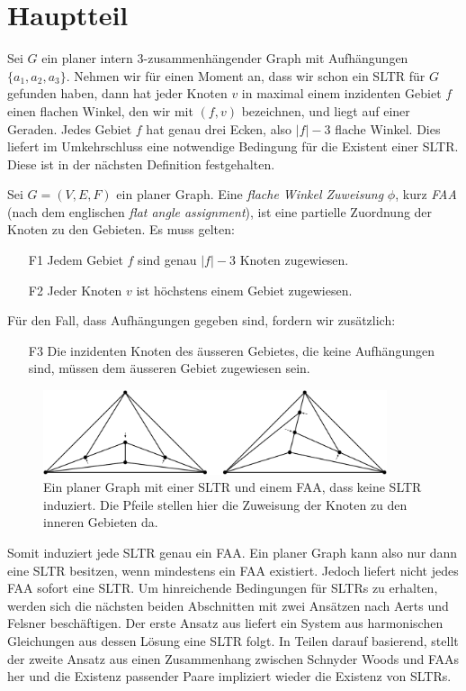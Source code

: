 \chapter{Hauptteil}

Sei $G$ ein planer intern 3-zusammenhängender Graph mit Aufhängungen $\{a_1,a_2,a_3\}$. Nehmen wir für einen Moment an, dass wir schon ein SLTR für $G$ gefunden haben, dann hat jeder Knoten $v$ in maximal einem inzidenten Gebiet $f$ einen flachen Winkel, den wir mit $(f,v)$ bezeichnen, und liegt auf einer Geraden. Jedes Gebiet $f$ hat genau drei Ecken, also $|f|-3$ flache Winkel. Dies liefert im Umkehrschluss eine notwendige Bedingung für die Existent einer SLTR. Diese ist in der nächsten Definition festgehalten.

\begin{definition}[FAA]\label{def_faa}
Sei $G=(V,E,F)$ ein planer Graph. Eine \textit{flache Winkel Zuweisung} $\phi$, kurz \textit{FAA} (nach dem englischen \textit{flat angle assignment}), ist eine partielle Zuordnung der Knoten zu den Gebieten. Es muss gelten:
\begin{itemize}
\item [F1] Jedem Gebiet $f$ sind genau $|f|-3$ Knoten zugewiesen.
\item [F2] Jeder Knoten $v$ ist höchstens einem Gebiet zugewiesen.
\end{itemize}
Für den Fall, dass Aufhängungen gegeben sind, fordern wir zusätzlich:
\begin{itemize}
\item [F3] Die inzidenten Knoten des äusseren Gebietes, die keine Aufhängungen sind, müssen dem äusseren Gebiet zugewiesen sein.
\end{itemize}

\begin{figure}[h]
	\centering
  \includegraphics[width=0.9\textwidth]{faa_def.png}
  \caption{Ein planer Graph mit einer SLTR und einem FAA, dass keine SLTR induziert. Die Pfeile stellen hier die Zuweisung der Knoten zu den inneren Gebieten da.}
\end{figure}

\end{definition}

Somit induziert jede SLTR genau ein FAA. Ein planer Graph kann also nur dann eine SLTR besitzen, wenn mindestens ein FAA existiert. Jedoch liefert nicht jedes FAA sofort eine SLTR. Um hinreichende Bedingungen für SLTRs zu erhalten, werden sich die nächsten beiden Abschnitten mit zwei Ansätzen nach Aerts und Felsner beschäftigen. Der erste Ansatz aus \cite{af13} liefert ein System aus harmonischen Gleichungen aus dessen Lösung eine SLTR folgt. In Teilen darauf basierend, stellt der zweite Ansatz aus \cite{af15} einen Zusammenhang zwischen Schnyder Woods und FAAs her und die Existenz passender Paare impliziert wieder die Existenz von SLTRs.



